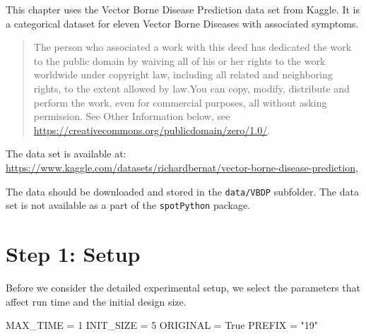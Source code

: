 \documentclass[
  letterpaper,
  DIV=11,
  numbers=noendperiod]{scrreprt}
\newenvironment{Shaded}{\begin{snugshade}}{\end{snugshade}}
\newcommand{\DecValTok}[1]{\textcolor[rgb]{0.68,0.00,0.00}{#1}}
\newcommand{\NormalTok}[1]{\textcolor[rgb]{0.00,0.23,0.31}{#1}}
\newcommand{\OperatorTok}[1]{\textcolor[rgb]{0.37,0.37,0.37}{#1}}
\newcommand{\StringTok}[1]{\textcolor[rgb]{0.13,0.47,0.30}{#1}}
\newcommand{\VariableTok}[1]{\textcolor[rgb]{0.07,0.07,0.07}{#1}}
\begin{document}
\begin{tcolorbox}[enhanced jigsaw, left=2mm, toprule=.15mm, colframe=quarto-callout-important-color-frame, leftrule=.75mm, title=\textcolor{quarto-callout-important-color}{\faExclamation}\hspace{0.5em}{Vector Borne Disease Prediction Data Set}, toptitle=1mm, opacitybacktitle=0.6, arc=.35mm, titlerule=0mm, opacityback=0, bottomtitle=1mm, coltitle=black, rightrule=.15mm, colback=white, colbacktitle=quarto-callout-important-color!10!white, breakable, bottomrule=.15mm]

This chapter uses the Vector Borne Disease Prediction data set from
Kaggle. It is a categorical dataset for eleven Vector Borne Diseases
with associated symptoms.

\begin{quote}
The person who associated a work with this deed has dedicated the work
to the public domain by waiving all of his or her rights to the work
worldwide under copyright law, including all related and neighboring
rights, to the extent allowed by law.You can copy, modify, distribute
and perform the work, even for commercial purposes, all without asking
permission. See Other Information below, see
\url{https://creativecommons.org/publicdomain/zero/1.0/}.
\end{quote}

The data set is available at:
\url{https://www.kaggle.com/datasets/richardbernat/vector-borne-disease-prediction},

The data should be downloaded and stored in the \texttt{data/VBDP}
subfolder. The data set is not available as a part of the
\texttt{spotPython} package.

\end{tcolorbox}

\hypertarget{sec-setup-19}{%
\section{Step 1: Setup}\label{sec-setup-19}}

Before we consider the detailed experimental setup, we select the
parameters that affect run time and the initial design size.

\begin{Shaded}
\begin{Highlighting}[]
\NormalTok{MAX\_TIME }\OperatorTok{=} \DecValTok{1}
\NormalTok{INIT\_SIZE }\OperatorTok{=} \DecValTok{5}
\NormalTok{ORIGINAL }\OperatorTok{=} \VariableTok{True}
\NormalTok{PREFIX }\OperatorTok{=} \StringTok{"19"}
\end{Highlighting}
\end{Shaded}
\end{document}
